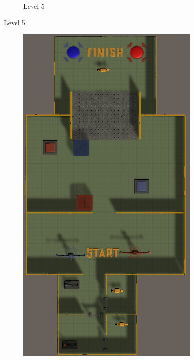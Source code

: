 \begin{figure}[h!]
\begin{subfigure}[b]{0.45\linewidth}
        \caption{Level 5}
        \label{fig:level 5}
      \end{subfigure}
\end{figure}


\newpage
\begin{figure}[h!]
    \centering    
    \begin{subfigure}[b]{0.45\linewidth}
        \includegraphics[width=\linewidth]{images/level_6.png}

\end{subfigure}
\end{figure}
